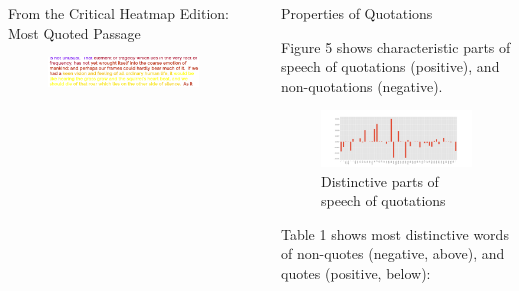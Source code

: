 \documentclass[final]{beamer}
\newlength{\sepwid}
\newlength{\onecolwid}
\newlength{\twocolwid}
\begin{document}
\begin{frame}[t]
\begin{columns}[t]
\begin{column}{\twocolwid}


\begin{block}{From the Critical Heatmap Edition: Most Quoted Passage}

\begin{figure}
\includegraphics[width=0.7\linewidth]{most-quoted.png}
\end{figure}
\end{block} 

\end{column} %

\begin{column}{\sepwid}\end{column} %

\begin{column}{\onecolwid} %


\begin{block}{Properties of Quotations}

Figure 5 shows characteristic parts of speech of quotations (positive), and non-quotations (negative). 

\begin{figure}
\includegraphics[width=0.9\linewidth]{pos-tags.png}
\caption{Distinctive parts of speech of quotations}
\end{figure}

Table 1 shows most distinctive words of non-quotes (negative, above), and quotes (positive, below): 


\end{block}
\end{column}
\end{columns}
\end{frame}
\end{document}
